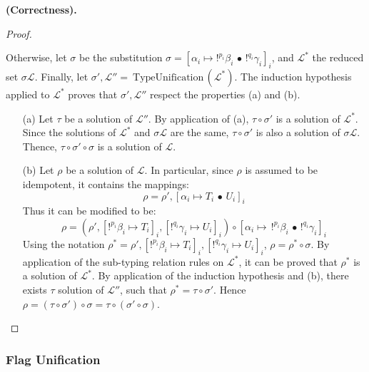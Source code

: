 \begin{thm}{\bf (Correctness).}
\begin{proof}
\begin{itemize}
				Otherwise, let $\sigma$ be the substitution $\sigma = [\alpha_i \mapsto !^{p_i}\beta_i \,\bullet\, !^{q_i}\gamma_i]_i$, and
				$\mathcal{L}^*$ the reduced set $\sigma \mathcal{L}$. Finally, let $\sigma', \mathcal{L''} = ~\text{TypeUnification}\,(\mathcal{L}^*)$.
				The induction hypothesis applied to $\mathcal{L}^*$ proves that $\sigma', \mathcal{L''}$ respect the properties (a) and (b).
					\begin{itemize}
						\item[(a)] Let $\tau$ be a solution of $\mathcal{L''}$. By application of (a), $\tau \circ \sigma'$ is a solution of $\mathcal{L}^*$.
							Since the solutions of $\mathcal{L}^*$ and $\sigma \mathcal{L}$ are the same, $\tau \circ \sigma'$ is also a solution of
							$\sigma \mathcal{L}$. Thence, $\tau \circ \sigma' \circ \sigma$ is a solution of $\mathcal{L}$.
							
						\item[(b)] Let $\rho$ be a solution of $\mathcal{L}$. In particular, since $\rho$ is assumed to be idempotent,
							it contains the mappings:
								$$\rho = \rho', [\alpha_i \mapsto T_i \,\bullet\, U_i]_i$$
							Thus it can be modified to be:
								$$\rho = (\rho',[!^{p_i}\beta_i \mapsto T_i]_i, [!^{q_i}\gamma_i \mapsto U_i]_i) \circ
									[\alpha_i \mapsto \,!^{p_i}\beta_i \,\bullet\, !^{q_i}\gamma_i]_i$$
							Using the notation $\rho^* = \rho' ,[!^{p_i}\beta_i \mapsto T_i]_i,[!^{q_i}\gamma_i \mapsto U_i]_i$,
							$\rho = \rho^* \circ \sigma$. By application of the sub-typing relation rules on $\mathcal{L}^*$, it can be proved
							that $\rho^*$ is a solution of $\mathcal{L}^*$. By application of the induction hypothesis and (b), there exists
							$\tau$ solution of $\mathcal{L''}$, such that $\rho^* = \tau \circ \sigma'$. Hence $\rho = (\tau \circ \sigma') \circ \sigma =
							\tau \circ (\sigma' \circ \sigma)$.
					\end{itemize}
		\end{itemize}
	\end{proof}
\end{thm}

\subsubsection{Flag Unification}\label{sssec-flag}

